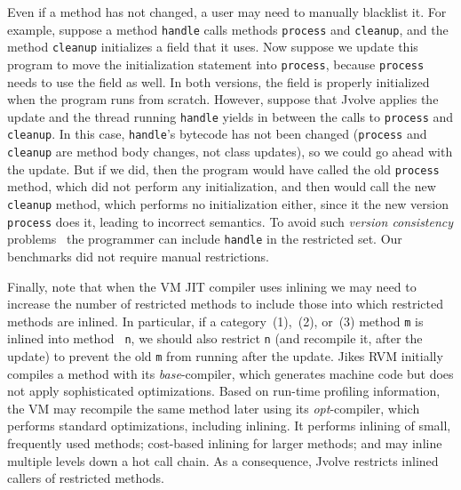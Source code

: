 \documentclass[9pt]{sigplanconf}
\newcommand{\DSU}{{\sc Jvolve}}
\newcommand{\JikesRVM}{Jikes RVM}
\begin{document}
Even if a method has not changed, a user may need to manually blacklist it.  
For example, suppose a method \texttt{handle} calls
methods \texttt{process} and \texttt{cleanup}, and the method
\texttt{cleanup} initializes a field that it uses.  Now suppose we
update this program to move the initialization statement into
\texttt{process}, because \texttt{process} needs to use the
field as well.  In both versions, the field is properly
initialized when the program runs from scratch.  However, suppose that
\DSU{}  applies the update and the thread running \texttt{handle}
yields in between the calls to \texttt{process} and \texttt{cleanup}.
In this case, \texttt{handle}'s bytecode has not been changed
(\texttt{process} and \texttt{cleanup} are method body changes, not
class updates), so we
could go ahead with the update.  But if we did, then the program would
have called the old \texttt{process} method, which did not perform any
initialization, and then would call the new
\texttt{cleanup} method, which performs no initialization either,
since it the new version \texttt{process} does it, leading to incorrect semantics.  %
To avoid
such \emph{version consistency}
problems~\cite{neamtiu08context} the programmer can include
\texttt{handle} in the restricted set.  Our benchmarks did not require 
manual restrictions.

Finally, note that when the VM JIT compiler uses inlining we may need
to increase the 
number of restricted methods to include those into which restricted
methods are inlined.  In particular, if a
category~(1),~(2), or~(3) method {\tt m} is inlined into method {\tt
  n}, we should also restrict {\tt n} (and recompile it, after the
update) to prevent the old {\tt m} from running after the update.
\JikesRVM{} 
initially compiles a method with its \emph{base}-compiler, which
generates machine code but does not apply sophisticated
optimizations. Based on run-time profiling information, the VM may
recompile the same method later using its \emph{opt}-compiler, which performs
standard optimizations, including inlining.
It performs inlining of small, frequently used methods; cost-based
inlining for larger methods; and may inline multiple levels down a hot call chain.  
As a consequence, \DSU{} restricts inlined callers of restricted methods.
\end{document}
